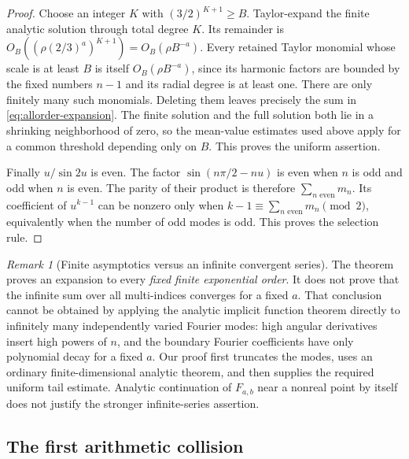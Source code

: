 \documentclass[11pt]{article}
\numberwithin{equation}{section}
\theoremstyle{plain}
\theoremstyle{definition}
\theoremstyle{remark}
\newtheorem{remark}[theorem]{Remark}
\begin{document}
\begin{proof}
Choose an integer $K$ with $(3/2)^{K+1}\ge B$. Taylor-expand the
finite analytic solution through total degree $K$. Its remainder is
$O_B((\rho(2/3)^a)^{K+1})=O_B(\rho B^{-a})$.
Every retained Taylor monomial whose scale is at least $B$ is itself
$O_B(\rho B^{-a})$, since its harmonic factors are bounded by the
fixed numbers $n-1$ and its radial degree is at least one. There are
only finitely many such monomials. Deleting them leaves precisely
the sum in \eqref{eq:allorder-expansion}. The finite solution and the
full solution both lie in a shrinking neighborhood of zero, so the
mean-value estimates used above apply for a common threshold depending
only on $B$. This proves the uniform assertion.

Finally $u/\sin2u$ is even. The factor
$\sin(n\pi/2-nu)$ is even when $n$ is odd and odd when $n$ is even.
The parity of their product is therefore $\sum_{n\text{ even}}m_n$.
Its coefficient of $u^{k-1}$ can be nonzero only when
$k-1\equiv\sum_{n\text{ even}}m_n\pmod2$, equivalently when the
number of odd modes is odd. This proves the selection rule.
\end{proof}

\begin{remark}[Finite asymptotics versus an infinite convergent series]
\label{rem:not-convergent}
The theorem proves an expansion to every \emph{fixed finite exponential
order}. It does not prove that the infinite sum over all multi-indices
converges for a fixed $a$. That conclusion cannot be obtained by
applying the analytic implicit function theorem directly to infinitely
many independently varied Fourier modes: high angular derivatives
insert high powers of $n$, and the boundary Fourier coefficients have
only polynomial decay for a fixed $a$. Our proof first truncates the
modes, uses an ordinary finite-dimensional analytic theorem, and
then supplies the required uniform tail estimate. Analytic continuation
of $F_{a,b}$ near a nonreal point by itself does not justify the
stronger infinite-series assertion.
\end{remark}

\subsection{The first arithmetic collision}
\end{document}
